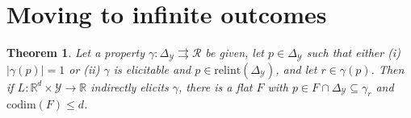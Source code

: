 \documentclass{article}
\newcommand{\reals}{\mathbb{R}}
\newcommand{\simplex}{\Delta_\Y}
\newcommand{\relint}[1]{\mathrm{relint}(#1)}
\newcommand{\codim}{\mathrm{codim}}
\newcommand{\affhull}{\mathrm{affhull}}
\newcommand{\R}{\mathcal{R}}
\newcommand{\Y}{\mathcal{Y}}
\newcommand{\toto}{\rightrightarrows}
\newtheorem{theorem}{Theorem}
\begin{document}
\section{Moving to infinite outcomes}
\begin{theorem}\label{thm:cvx-flats}
	Let a property $\gamma:\simplex\toto\R$ be given, let $p\in\simplex$ such that either (i) $|\gamma(p)|=1$ or (ii) $\gamma$ is elicitable and $p\in\relint\simplex$, and let $r\in\gamma(p)$.
	Then if $L: \reals^d \times \Y \to \reals$ indirectly elicits $\gamma$, there is a flat $F$ with $p\in F \cap \simplex \subseteq \gamma_r$ and $\codim(F) \leq d$.
\end{theorem}
\end{document}

